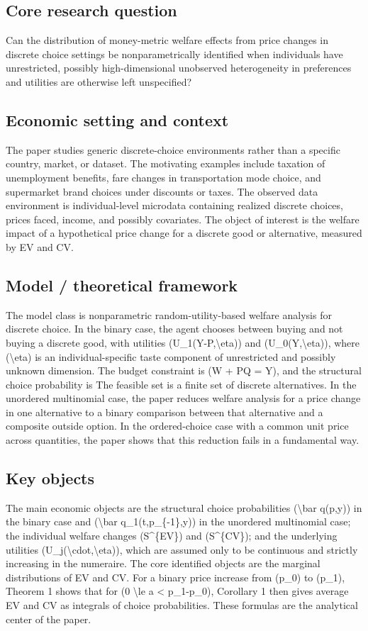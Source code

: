 \documentclass[11pt,a4paper]{article}
\begin{document}
\subsection*{Core research question}
Can the distribution of money-metric welfare effects from price changes in discrete choice settings be nonparametrically identified when individuals have unrestricted, possibly high-dimensional unobserved heterogeneity in preferences and utilities are otherwise left unspecified?

\subsection*{Economic setting and context}
The paper studies generic discrete-choice environments rather than a specific country, market, or dataset. The motivating examples include taxation of unemployment benefits, fare changes in transportation mode choice, and supermarket brand choices under discounts or taxes. The observed data environment is individual-level microdata containing realized discrete choices, prices faced, income, and possibly covariates. The object of interest is the welfare impact of a hypothetical price change for a discrete good or alternative, measured by EV and CV.

\subsection*{Model / theoretical framework}
The model class is nonparametric random-utility-based welfare analysis for discrete choice. In the binary case, the agent chooses between buying and not buying a discrete good, with utilities (U\_1(Y-P,\textbackslash{}eta)) and (U\_0(Y,\textbackslash{}eta)), where (\textbackslash{}eta) is an individual-specific taste component of unrestricted and possibly unknown dimension. The budget constraint is (W + PQ = Y), and the structural choice probability is The feasible set is a finite set of discrete alternatives. In the unordered multinomial case, the paper reduces welfare analysis for a price change in one alternative to a binary comparison between that alternative and a composite outside option. In the ordered-choice case with a common unit price across quantities, the paper shows that this reduction fails in a fundamental way.

\subsection*{Key objects}
The main economic objects are the structural choice probabilities (\textbackslash{}bar q(p,y)) in the binary case and (\textbackslash{}bar q\_1(t,p\_\{-1\},y)) in the unordered multinomial case; the individual welfare changes (S\textasciicircum{}\{EV\}) and (S\textasciicircum{}\{CV\}); and the underlying utilities (U\_j(\textbackslash{}cdot,\textbackslash{}eta)), which are assumed only to be continuous and strictly increasing in the numeraire. The core identified objects are the marginal distributions of EV and CV. For a binary price increase from (p\_0) to (p\_1), Theorem 1 shows that for (0 \textbackslash{}le a < p\_1-p\_0), Corollary 1 then gives average EV and CV as integrals of choice probabilities. These formulas are the analytical center of the paper.
\end{document}
